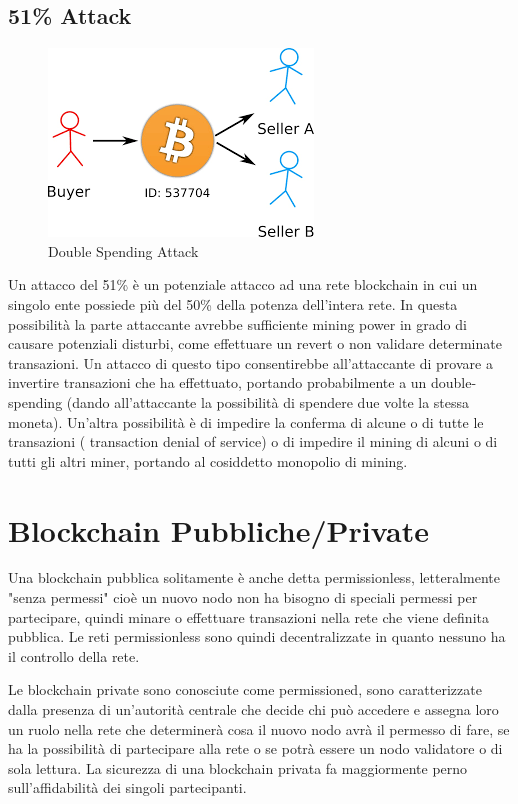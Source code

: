 \documentclass[11pt,a4paper,titlepage,twoside,openright]{report}
\begin{document}
\subsection{51\% Attack}
\begin{figure}[h]
	\includegraphics[height=0.2\textheight]{dsa}
	\centering
	\caption{Double Spending Attack}
	\label{fig:ds-attack}
\end{figure}
Un attacco del 51\% è un potenziale attacco ad una rete blockchain in cui un singolo ente possiede più del 50\% della potenza dell'intera rete. In questa possibilità la parte attaccante avrebbe sufficiente mining power in grado di causare potenziali disturbi, come effettuare un revert o non validare determinate transazioni. Un attacco di questo tipo consentirebbe all’attaccante di provare a invertire transazioni che ha effettuato, portando probabilmente a un double-spending (dando all'attaccante la possibilità di spendere due volte la stessa moneta). Un'altra possibilità è di impedire la conferma di alcune o di tutte le transazioni ( transaction denial of service) o di impedire il mining di alcuni o di tutti gli altri miner, portando al cosiddetto monopolio di mining.

\section{Blockchain Pubbliche/Private}
Una blockchain pubblica solitamente è anche detta permissionless, letteralmente "senza permessi" cioè un nuovo nodo non ha bisogno di speciali permessi per partecipare, quindi minare o effettuare transazioni nella rete che viene definita pubblica. Le reti permissionless sono quindi decentralizzate in quanto nessuno ha il controllo della rete.

Le blockchain private sono conosciute come permissioned, sono caratterizzate dalla presenza di un’autorità centrale che decide chi può accedere e assegna loro un ruolo nella rete che determinerà cosa il nuovo nodo avrà il permesso di fare, se ha la possibilità di partecipare alla rete o se potrà essere un nodo validatore o di sola lettura. La sicurezza di una blockchain privata fa maggiormente perno sull'affidabilità dei singoli partecipanti.
\end{document}
